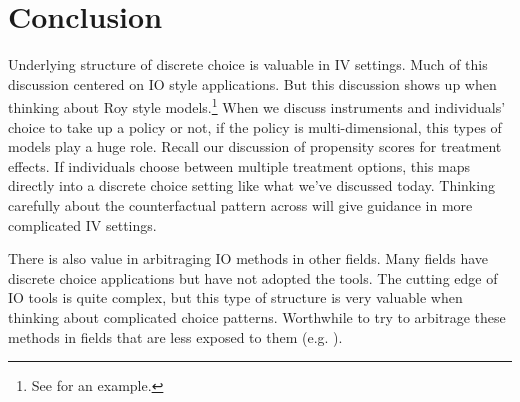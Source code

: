\documentclass{tufte-handout}
\theoremstyle{break}
\begin{document}
\section{Conclusion}
Underlying structure of discrete choice is valuable in IV settings. Much of this discussion centered on IO style applications. But this discussion shows up when thinking about Roy style models.\footnote{See \citet{hull2018estimating} for an example.}  When we discuss instruments and individuals' choice to take up a policy or not, if the policy is multi-dimensional, this types of models play a huge role. Recall our discussion of propensity scores for treatment effects. If individuals choose between multiple treatment options, this maps directly into a discrete choice setting like what  we've discussed today. Thinking carefully about the counterfactual pattern across  will give guidance in more complicated IV settings.

There is also value in arbitraging IO methods in other fields. Many fields have discrete choice applications but have not adopted the tools. The cutting edge of IO tools is quite complex, but this type of structure is very valuable when thinking about complicated choice patterns. Worthwhile to try to arbitrage these methods in fields that are less exposed to them (e.g. \citet{koijen2019demand}).




\end{document}
